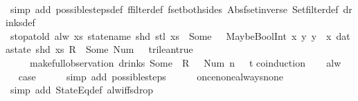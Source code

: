 \begin{isabellebody}
%
\isadelimproof
\ \ %
\endisadelimproof
%
\isatagproof
{}\isamarkupfalse%
\ {\isacharparenleft}simp\ add{\isacharcolon}\ possible{\isacharunderscore}steps{\isacharunderscore}def\ ffilter{\isacharunderscore}def\ fset{\isacharunderscore}both{\isacharunderscore}sides\ Abs{\isacharunderscore}fset{\isacharunderscore}inverse\ Set{\isachardot}filter{\isacharunderscore}def\ drinks{\isacharunderscore}def{\isacharparenright}%
\endisatagproof
{\isafoldproof}%
%
\isadelimproof
\isanewline
%
\endisadelimproof
\isanewline
{}\isamarkupfalse%
\ stop{\isacharunderscore}at{\isacharunderscore}{}{\isacharunderscore}old{\isacharcolon}\ {\isachardoublequoteopen}alw\ {\isacharparenleft}{\isasymlambda}xs{\isachardot}\ statename\ {\isacharparenleft}shd\ {\isacharparenleft}stl\ xs{\isacharparenright}{\isacharparenright}\ {\isacharequal}\ Some\ {}\ {\isasymlongrightarrow}\ MaybeBoolInt\ {\isacharparenleft}{\isasymlambda}x\ y{\isachardot}\ y\ {\isacharless}\ x{\isacharparenright}\ {\isacharparenleft}datastate\ {\isacharparenleft}shd\ xs{\isacharparenright}\ {\isacharparenleft}R\ {}{\isacharparenright}{\isacharparenright}\ {\isacharparenleft}Some\ {\isacharparenleft}Num\ {}{\isacharparenright}{\isacharparenright}\ {\isacharequal}\ trilean{\isachardot}true{\isacharparenright}\isanewline
\ \ \ \ \ {\isacharparenleft}make{\isacharunderscore}full{\isacharunderscore}observation\ drinks\ {\isacharparenleft}Some\ {}{\isacharparenright}\ {\isacharless}R\ {}\ {\isacharcolon}{\isacharequal}\ Num\ {\isacharparenleft}n\ {\isacharminus}\ {}{\isacharparenright}{\isachargreater}\ t{\isacharparenright}{\isachardoublequoteclose}\isanewline
%
\isadelimproof
%
\endisadelimproof
%
\isatagproof
{}\isamarkupfalse%
{\isacharparenleft}coinduction{\isacharparenright}\isanewline
\ \ \isamarkupfalse%
\ alw\isanewline
\ \ \isamarkupfalse%
\ \isamarkupfalse%
\ {\isacharquery}case\isanewline
\ \ \ \ \isamarkupfalse%
\ {\isacharparenleft}simp\ add{\isacharcolon}\ possible{\isacharunderscore}steps{\isacharunderscore}{}{\isacharparenright}\isanewline
\ \ \ \ \isamarkupfalse%
\ once{\isacharunderscore}none{\isacharunderscore}always{\isacharunderscore}none\isanewline
\ \ \ \ \isamarkupfalse%
\ {\isacharparenleft}simp\ add{\isacharcolon}\ StateEq{\isacharunderscore}def\ alw{\isacharunderscore}iff{\isacharunderscore}sdrop{\isacharparenright}\isanewline
{}\isamarkupfalse%

\end{isabellebody}
